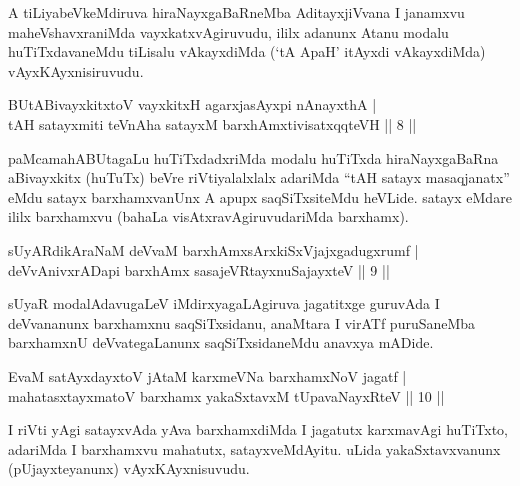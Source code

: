 \begin{artha}
A tiLiyabeVkeMdiruva hiraNayxgaBaRneMba AditayxjiVvana I janamxvu maheVshavxraniMda vayxkatxvAgiruvudu, ililx adanunx Atanu modalu huTiTxdavaneMdu tiLisalu vAkayxdiMda (`tA ApaH' itAyxdi vAkayxdiMda) vAyxKAyxnisiruvudu.
\end{artha}

\begin{shl}
\footnotemark{}BUtABivayxkitxtoV vayxkitxH agarxjasAyxpi nAnayxthA | \\
tAH satayxmiti teVnA\s \s ha satayxM barxhAmxtivisatxqqteVH \hfill ||  8 || 
\end{shl}

\begin{artha}
paMcamahABUtagaLu huTiTxdadxriMda modalu huTiTxda hiraNayxgaBaRna aBivayxkitx (huTuTx) beVre riVtiyalalxlalx adariMda ``tAH satayx masaqjanatx'' eMdu satayx barxhamxvanUnx A apupx saqSiTxsiteMdu heVLide. satayx eMdare ililx barxhamxvu (bahaLa visAtxravAgiruvudariMda barxhamx).
\end{artha}



\begin{shl}
sUyARdikAraNaM deVvaM barxhAmx\s sArxkiSxVjajxgadugxrumf | \\
deVvAnivxrADapi barxhAmx sasajeVRtayxnuSajayxteV \hfill ||  9 || 
\end{shl}

\begin{artha}
sUyaR modalAdavugaLeV iMdirxyagaLAgiruva jagatitxge guruvAda I deVvananunx barxhamxnu saqSiTxsidanu, anaMtara I virATf puruSaneMba barxhamxnU deVvategaLanunx saqSiTxsidaneMdu anavxya mADide.
\end{artha}

\begin{shl}
EvaM satAyxdayxtoV jAtaM karxmeVNa barxhamxNoV jagatf | \\
mahatasxtayxmatoV barxhamx yakaSxtavxM tUpavaNayxRteV \hfill ||  10 || 
\end{shl}

\begin{artha}
I riVti yAgi satayxvAda yAva barxhamxdiMda I jagatutx karxmavAgi huTiTxto, adariMda I barxhamxvu mahatutx, satayxveMdAyitu. uLida yakaSxtavxvanunx (pUjayxteyanunx) vAyxKAyxnisuvudu.
\end{artha}

